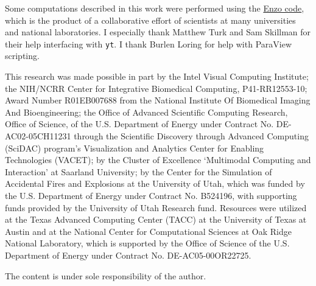 Some computations described in this work were performed using the
\href{http://enzo-project.org}{Enzo code}, which is the product of a
collaborative effort of scientists at many universities and national
laboratories.  I especially thank Matthew Turk and Sam Skillman for
their help interfacing with \texttt{yt}.  I thank Burlen Loring for
help with ParaView scripting.

This research was made possible in part by the Intel Visual
Computing Institute; the NIH/NCRR Center for Integrative Biomedical
Computing, P41-RR12553-10; Award Number R01EB007688 from the National
Institute Of Biomedical Imaging And Bioengineering; the Office of
Advanced Scientific Computing Research, Office of Science, of the
U.S. Department of Energy under Contract No. DE-AC02-05CH11231
through the Scientific Discovery through Advanced Computing (SciDAC)
program's Visualization and Analytics Center for Enabling Technologies
(VACET); by the Cluster of Excellence `Multimodal Computing and
Interaction' at Saarland University; by the Center for the Simulation
of Accidental Fires and Explosions at the University of Utah, which was
funded by the U.S. Department of Energy under Contract No. B524196,
with supporting funds provided by the University of Utah Research
fund. Resources were utilized at the Texas Advanced Computing Center
(TACC) at the University of Texas at Austin and at the National Center
for Computational Sciences at Oak Ridge National Laboratory, which is
supported by the Office of Science of the U.S. Department of Energy
under Contract No. DE-AC05-00OR22725.

The content is under sole responsibility of the author.
